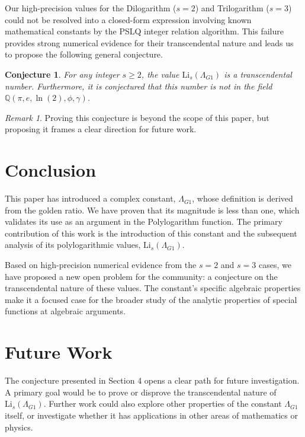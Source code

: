\documentclass{amsart}
\theoremstyle{plain}
\newtheorem{conjecture}[theorem]{Conjecture}
\theoremstyle{definition}
\theoremstyle{remark}
\newtheorem*{remark}{Remark}
\newcommand{\LambdaG}{\Lambda_{G1}}
\begin{document}
Our high-precision values for the Dilogarithm ($s=2$) and Trilogarithm ($s=3$) could not be resolved into a closed-form expression involving known mathematical constants by the PSLQ integer relation algorithm. This failure provides strong numerical evidence for their transcendental nature and leads us to propose the following general conjecture.

\begin{conjecture}
For any integer $s \ge 2$, the value $\mathrm{Li}_s(\LambdaG)$ is a transcendental number. Furthermore, it is conjectured that this number is not in the field $\mathbb{Q}(\pi, e, \ln(2), \phi, \gamma)$.
\end{conjecture}
\begin{remark}
Proving this conjecture is beyond the scope of this paper, but proposing it frames a clear direction for future work.
\end{remark}

\section{Conclusion}
This paper has introduced a complex constant, $\LambdaG$, whose definition is derived from the golden ratio. We have proven that its magnitude is less than one, which validates its use as an argument in the Polylogarithm function. The primary contribution of this work is the introduction of this constant and the subsequent analysis of its polylogarithmic values, $\mathrm{Li}_s(\LambdaG)$.

Based on high-precision numerical evidence from the $s=2$ and $s=3$ cases, we have proposed a new open problem for the community: a conjecture on the transcendental nature of these values. The constant's specific algebraic properties make it a focused case for the broader study of the analytic properties of special functions at algebraic arguments.

\section{Future Work}
The conjecture presented in Section 4 opens a clear path for future investigation. A primary goal would be to prove or disprove the transcendental nature of $\mathrm{Li}_s(\LambdaG)$. Further work could also explore other properties of the constant $\LambdaG$ itself, or investigate whether it has applications in other areas of mathematics or physics.
\end{document}
